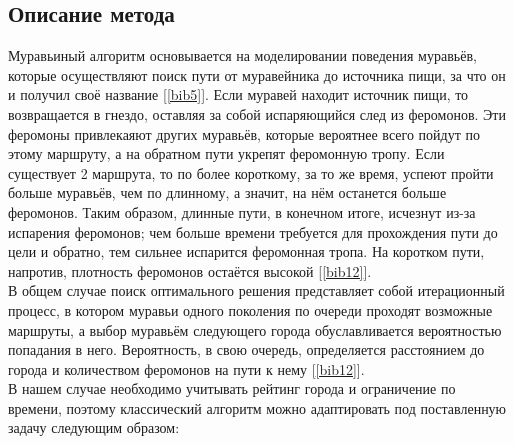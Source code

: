 \subsection{Описание метода}
Муравьиный алгоритм основывается на моделировании поведения муравьёв, которые осуществляют поиск пути от муравейника до источника пищи, за что он и получил своё название [\ref{bib5}]. Если муравей находит источник пищи, то возвращается в гнездо, оставляя за собой испаряющийся след из феромонов. Эти феромоны привлекаяют других муравьёв, которые вероятнее всего пойдут по этому маршруту, а на обратном пути укрепят феромонную тропу. Если существует 2 маршрута, то по более короткому, за то же время, успеют пройти больше муравьёв, чем по длинному, а значит, на нём останется больше феромонов. Таким образом, длинные пути, в конечном итоге, исчезнут из-за испарения феромонов; чем больше времени требуется для прохождения пути до цели и обратно, тем сильнее испарится феромонная тропа. На коротком пути, напротив, плотность феромонов остаётся высокой [\ref{bib12}].\\

В общем случае поиск оптимального решения представляет собой итерационный процесс, в котором муравьи одного поколения по очереди проходят возможные маршруты, а выбор муравьём следующего города обуславливается вероятностью попадания в него. Вероятность, в свою очередь, определяется расстоянием до города и количеством феромонов на пути к нему [\ref{bib12}].\\

В нашем случае необходимо учитывать рейтинг города и ограничение по времени, поэтому классический алгоритм можно адаптировать под поставленную задачу следующим образом:\\

